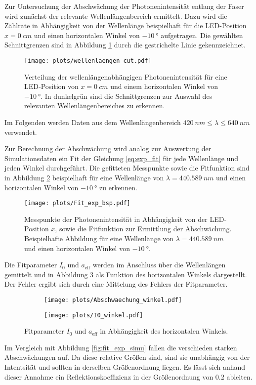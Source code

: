 Zur Untersuchung der Abschwächung der Photonenintensität entlang der Faser wird zunächst der relevante Wellenlängenbereich ermittelt. Dazu wird die Zählrate in Abhängigkeit von der Wellenlänge beispielhaft für die LED-Position $x = \SI{0}{cm}$ und einen horizontalen Winkel von $\SI{-10}{°}$ aufgetragen. Die gewählten Schnittgrenzen sind in Abbildung \ref{fig:wellenlaengen_cut} durch die gestrichelte Linie gekennzeichnet.
\begin{figure}
    \centering
    \texttt{[image: plots/wellenlaengen\_cut.pdf]}
    \caption{Verteilung der wellenlängenabhängigen Photonenintensität für eine LED-Position von $x = \SI{0}{cm}$ und einem horizontalen Winkel von $\SI{-10}{°}$. In dunkelgrün sind die Schnittgrenzen zur Auswahl des relevanten Wellenlängenbereiches zu erkennen.}
    \label{fig:wellenlaengen_cut}
\end{figure}
\FloatBarrier
Im Folgenden werden Daten aus dem Wellenlängenbereich $\SI{420}{nm} \leq \lambda \leq \SI{640}{nm}$ verwendet.

Zur Berechnung der Abschwächung wird analog zur Auswertung der Simulationsdaten ein Fit der Gleichung \eqref{eq:exp_fit} für jede Wellenlänge und jeden Winkel durchgeführt. Die gefitteten Messpunkte sowie die Fitfunktion sind in Abbildung \ref{fig:Fit_exp_bsp} beispielhaft für eine Wellenlänge von $\lambda = \SI{440.589}{nm}$ und einen horizontalen Winkel von $\SI{-10}{°}$ zu erkennen.
\begin{figure}
    \centering
    \texttt{[image: plots/Fit\_exp\_bsp.pdf]}
    \caption{Messpunkte der Photonenintensität in Abhängigkeit von der LED-Position $x$, sowie die Fitfunktion zur Ermittlung der Abschwächung. Beispielhafte Abbildung für eine Wellenlänge von $\lambda = \SI{440.589}{nm}$ und einen horizontalen Winkel von $\SI{-10}{°}$.}
    \label{fig:Fit_exp_bsp}
\end{figure}
\FloatBarrier
Die Fitparameter $I_0$ und $a_\mathrm{eff}$ werden im Anschluss über die Wellenlängen gemittelt und in Abbildung \ref{fig:a_I0_winkel} als Funktion des horizontalen Winkels dargestellt. Der Fehler ergibt sich durch eine Mittelung des Fehlers der Fitparameter.
\begin{figure}
    \begin{subfigure}[c]{0.5\textwidth}    
        \texttt{[image: plots/Abschwaechung\_winkel.pdf]}
    \end{subfigure}
    \begin{subfigure}[c]{0.5\textwidth}
        \texttt{[image: plots/I0\_winkel.pdf]}
    \end{subfigure}
    \caption{Fitparameter $I_0$ und $a_\mathrm{eff}$ in Abhängigkeit des horizontalen Winkels.}
    \label{fig:a_I0_winkel}
\end{figure}
Im Vergleich mit Abbildung \ref{fig:fit_exp_simu} fallen die verschieden starken Abschwächungen auf. Da diese relative Größen sind, sind sie unabhängig von der Intentsität und sollten in derselben Größenordnung liegen. Es lässt sich anhand dieser Annahme ein Reflektionskoeffizienz in der Größenordnung von $0.2$ ableiten.

